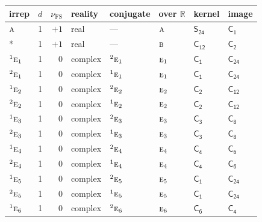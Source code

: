 \documentclass[10pt,a4paper]{article}
\numberwithin{equation}{section}
\newcommand{\grp}[1]{\mathsf{#1}}
\newcommand{\irr}[1]{\text{\normalfont\scshape #1}}
\newcommand{\conjpair}[1]{{}^{#1}}
\newcommand{\detbox}[1]{{\setlength{\fboxsep}{1pt}\fbox{#1}}}
\newcommand{\fsind}{\nu_{\mathrm{FS}}}
\begin{document}
{\small\renewcommand{\arraystretch}{1.25}\setlength{\tabcolsep}{4pt}\begin{longtable}{@{}lrrlllll@{}}\toprule
irrep & $d$ & $\fsind$ & reality & conjugate & over $\mathbb{R}$ & kernel & image\\\midrule\endhead
\bottomrule\endfoot\endlastfoot
$\irr{a}$ & 1 & $+1$ & real & --- & $\irr{a}$ & \href{S24.pdf}{$\grp{S_{24}}$} & \href{C1.pdf}{$\grp{C_{1}}$}\\*
\detbox{$\irr{b}$} & 1 & $+1$ & real & --- & $\irr{b}$ & \href{C12.pdf}{$\grp{C_{12}}$} & \href{C2.pdf}{$\grp{C_{2}}$}\\
$\conjpair{1}\irr{e}_{1}$ & 1 & $0$ & complex & $\conjpair{2}\irr{e}_{1}$ & $\irr{e}_{1}$ & \href{C1.pdf}{$\grp{C_{1}}$} & $\grp{C_{24}}$\\
$\conjpair{2}\irr{e}_{1}$ & 1 & $0$ & complex & $\conjpair{1}\irr{e}_{1}$ & $\irr{e}_{1}$ & \href{C1.pdf}{$\grp{C_{1}}$} & $\grp{C_{24}}$\\
$\conjpair{1}\irr{e}_{2}$ & 1 & $0$ & complex & $\conjpair{2}\irr{e}_{2}$ & $\irr{e}_{2}$ & \href{C2.pdf}{$\grp{C_{2}}$} & \href{C12.pdf}{$\grp{C_{12}}$}\\
$\conjpair{2}\irr{e}_{2}$ & 1 & $0$ & complex & $\conjpair{1}\irr{e}_{2}$ & $\irr{e}_{2}$ & \href{C2.pdf}{$\grp{C_{2}}$} & \href{C12.pdf}{$\grp{C_{12}}$}\\
$\conjpair{1}\irr{e}_{3}$ & 1 & $0$ & complex & $\conjpair{2}\irr{e}_{3}$ & $\irr{e}_{3}$ & \href{C3.pdf}{$\grp{C_{3}}$} & \href{C8.pdf}{$\grp{C_{8}}$}\\
$\conjpair{2}\irr{e}_{3}$ & 1 & $0$ & complex & $\conjpair{1}\irr{e}_{3}$ & $\irr{e}_{3}$ & \href{C3.pdf}{$\grp{C_{3}}$} & \href{C8.pdf}{$\grp{C_{8}}$}\\
$\conjpair{1}\irr{e}_{4}$ & 1 & $0$ & complex & $\conjpair{2}\irr{e}_{4}$ & $\irr{e}_{4}$ & \href{C4.pdf}{$\grp{C_{4}}$} & \href{C6.pdf}{$\grp{C_{6}}$}\\
$\conjpair{2}\irr{e}_{4}$ & 1 & $0$ & complex & $\conjpair{1}\irr{e}_{4}$ & $\irr{e}_{4}$ & \href{C4.pdf}{$\grp{C_{4}}$} & \href{C6.pdf}{$\grp{C_{6}}$}\\
$\conjpair{1}\irr{e}_{5}$ & 1 & $0$ & complex & $\conjpair{2}\irr{e}_{5}$ & $\irr{e}_{5}$ & \href{C1.pdf}{$\grp{C_{1}}$} & $\grp{C_{24}}$\\
$\conjpair{2}\irr{e}_{5}$ & 1 & $0$ & complex & $\conjpair{1}\irr{e}_{5}$ & $\irr{e}_{5}$ & \href{C1.pdf}{$\grp{C_{1}}$} & $\grp{C_{24}}$\\
$\conjpair{1}\irr{e}_{6}$ & 1 & $0$ & complex & $\conjpair{2}\irr{e}_{6}$ & $\irr{e}_{6}$ & \href{C6.pdf}{$\grp{C_{6}}$} & \href{C4.pdf}{$\grp{C_{4}}$}\\

\end{longtable}}
\end{document}
